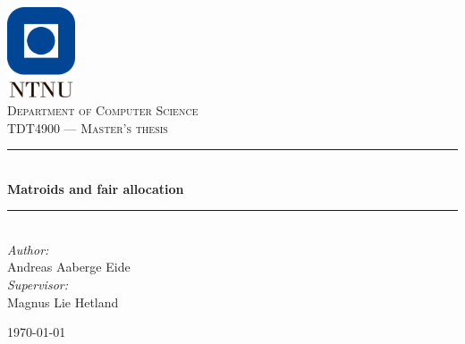 \documentclass[b5paper]{report}
\begin{document}
\newcommand{\mono}[1]{$\texttt{#1}$}

\begin{titlepage}
  \newcommand{\HRule}{\rule{\linewidth}{0.5mm}}

  \vbox{ }
  \vbox{ }
  \begin{center}
    \includegraphics[width=0.15\textwidth]{ntnu.png}\\[1cm]
    \textsc{\Large Department of Computer Science}\\[1.5cm]
    \textsc{\large TDT4900 --- Master's thesis}\\[0.5cm]
    \vbox{ }

    \HRule \\[0.4cm]
    { \huge \bfseries Matroids and fair allocation}\\[0.4cm]
    \HRule \\[1.5cm]

    \large
    \emph{Author:}\\
    Andreas Aaberge Eide\\[0.5cm]
    \emph{Supervisor:}\\
    Magnus Lie Hetland
    \vfill

    {\large \today\par}
  \end{center}
\end{titlepage}

\tableofcontents










\printskelnotes{}


\end{document}
